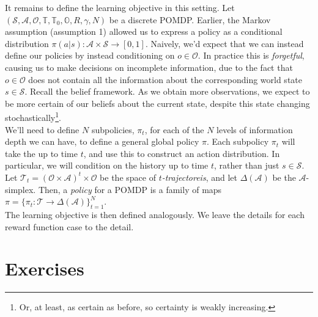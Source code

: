 \documentclass[12pt]{article}
\begin{document}
It remains to define the learning objective in this setting. Let $(\mathcal{S}, \mathcal{A}, \mathcal{O}, \mathbb{T}, 
\mathbb{T}_0, \mathbb{O}, R, \gamma, N)$ be a discrete POMDP. Earlier, the Markov assumption (assumption 1) allowed us to 
express a policy as a conditional distribution $\pi(a | s): \mathcal{A} \times \mathcal{S} \to [0,1]$. Naively, we'd expect 
that we can instead define our policies by instead conditioning on $o \in \mathcal{O}$. In practice this is \textit{forgetful}, 
causing us to make decisions on incomplete information, due to the fact that $o \in \mathcal{O}$ does not contain all the 
information about the corresponding world state $s \in \mathcal{S}$. Recall the belief framework. As we obtain more observations, 
we expect to be more certain of our beliefs about the current state, despite this state changing stochastically\footnote{
    Or, at least, as certain as before, so certainty is weakly increasing. 
}. \\

We'll need to define $N$ subpolicies, $\pi_t$, for each of the $N$ levels of information depth we can have, to define 
a general global policy $\pi$. Each subpolicy $\pi_t$ will take the up to time $t$, and use this to construct an action 
distribution. In particular, we will condition on the history up to time $t$, rather than just $s \in \mathcal{S}$. Let 
$\mathcal{T}_t = (\mathcal{O} \times \mathcal{A})^t \times \mathcal{O}$ be the space of $t$\textit{-trajectoreis}, and let $\Delta(
\mathcal{A})$ be the $\mathcal{A}$-simplex. Then, a \textit{policy} for a POMDP is a family of maps $\pi = \{\pi_t: \mathcal{T} 
\to \Delta(\mathcal{A})\}_{t=1}^N$.  \\

The learning objective is then defined analogously. We leave the details for each reward function case to the detail.

\section{Exercises}
\end{document}
